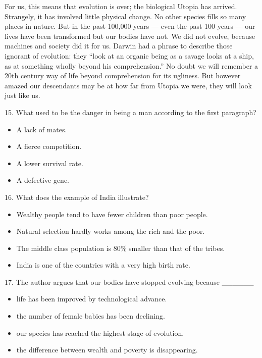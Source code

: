\documentclass[UTF8,11pt]{ctexart}
\begin{document}
For us, this means that evolution is over; the biological Utopia has arrived. Strangely, it has involved little physical change. No other species fills so many places in nature. But in the past 100,000 years — even the past 100 years — our lives have been transformed but our bodies have not. We did not evolve, because machines and society did it for us. Darwin had a phrase to describe those ignorant of evolution: they “look at an organic being as a savage looks at a ship, as at something wholly beyond his comprehension.” No doubt we will remember a 20th century way of life beyond comprehension for its ugliness. But however amazed our descendants may be at how far from Utopia we were, they will look just like us.


15. What used to be the danger in being a man according to the first paragraph?


\begin{itemize}[leftmargin=2em,itemsep=.2em,topsep=.4em]\item[A.] A lack of mates.
\item[B.] A fierce competition.
\item[C.] A lower survival rate.
\item[D.] A defective gene.
\end{itemize}

16. What does the example of India illustrate?


\begin{itemize}[leftmargin=2em,itemsep=.2em,topsep=.4em]\item[A.] Wealthy people tend to have fewer children than poor people.
\item[B.] Natural selection hardly works among the rich and the poor.
\item[C.] The middle class population is 80\% smaller than that of the tribes.
\item[D.] India is one of the countries with a very high birth rate.
\end{itemize}

17. The author argues that our bodies have stopped evolving because \_\_\_\_\_\_


\begin{itemize}[leftmargin=2em,itemsep=.2em,topsep=.4em]\item[A.] life has been improved by technological advance.
\item[B.] the number of female babies has been declining.
\item[C.] our species has reached the highest stage of evolution.
\item[D.] the difference between wealth and poverty is disappearing.
\end{itemize}
\end{document}
